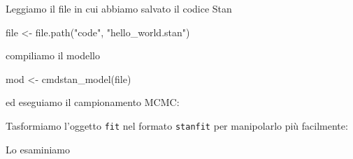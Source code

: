 \documentclass[
  11pt,
]{krantz}
\makeatletter
\newenvironment{Shaded}{\begin{snugshade}}{\end{snugshade}}
\newcommand{\AttributeTok}[1]{\textcolor[rgb]{0.61,0.61,0.61}{#1}}
\newcommand{\CommentTok}[1]{\textcolor[rgb]{0.37,0.37,0.37}{\textit{#1}}}
\newcommand{\DecValTok}[1]{\textcolor[rgb]{0.06,0.06,0.06}{#1}}
\newcommand{\FunctionTok}[1]{\textcolor[rgb]{0,0,0}{#1}}
\newcommand{\NormalTok}[1]{#1}
\newcommand{\OtherTok}[1]{\textcolor[rgb]{0.37,0.37,0.37}{#1}}
\newcommand{\SpecialCharTok}[1]{\textcolor[rgb]{0,0,0}{#1}}
\newcommand{\StringTok}[1]{\textcolor[rgb]{0.5,0.5,0.5}{#1}}
\newenvironment{kframe}{%
\medskip{}
\setlength{\fboxsep}{.8em}
 \def\at@end@of@kframe{}%
 \ifinner\ifhmode%
  \def\at@end@of@kframe{\end{minipage}}%
  \begin{minipage}{\columnwidth}%
 \fi\fi%
 \def\FrameCommand##1{\hskip\@totalleftmargin \hskip-\fboxsep
 \colorbox{shadecolor}{##1}\hskip-\fboxsep
     \hskip-\linewidth \hskip-\@totalleftmargin \hskip\columnwidth}%
 \MakeFramed {\advance\hsize-\width
   \@totalleftmargin\z@ \linewidth\hsize
   \@setminipage}}%
 {\par\unskip\endMakeFramed%
 \at@end@of@kframe}
\renewenvironment{Shaded}{\begin{kframe}}{\end{kframe}}
\theoremstyle{definition}
\theoremstyle{definition}
\theoremstyle{definition}
\theoremstyle{definition}
\theoremstyle{remark}
\makeatother
\begin{document}
Leggiamo il file in cui abbiamo salvato il codice Stan

\begin{Shaded}
\begin{Highlighting}[]
\NormalTok{file }\OtherTok{\textless{}{-}} \FunctionTok{file.path}\NormalTok{(}\StringTok{"code"}\NormalTok{, }\StringTok{"hello\_world.stan"}\NormalTok{)}
\end{Highlighting}
\end{Shaded}

compiliamo il modello

\begin{Shaded}
\begin{Highlighting}[]
\NormalTok{mod }\OtherTok{\textless{}{-}} \FunctionTok{cmdstan\_model}\NormalTok{(file)}
\end{Highlighting}
\end{Shaded}

ed eseguiamo il campionamento MCMC:

\begin{Shaded}
\end{Shaded}

Tasformiamo l'oggetto \texttt{fit} nel formato \texttt{stanfit} per manipolarlo più facilmente:

\begin{Shaded}
\end{Shaded}

Lo esaminiamo

\begin{Shaded}
\end{Shaded}
\end{document}
